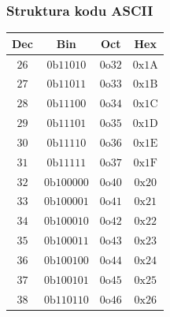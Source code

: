 \documentclass[10pt,t]{beamer}
\newcommand{\btext}{\text{b}}
\newcommand{\otext}{\text{o}}
\newcommand{\xtext}{\text{x}}
\newcommand{\Atext}{\text{A}}
\newcommand{\Btext}{\text{B}}
\newcommand{\Ctext}{\text{C}}
\newcommand{\Dtext}{\text{D}}
\newcommand{\Etext}{\text{E}}
\newcommand{\Ftext}{\text{F}}
\begin{document}
\begin{frame}
  \frametitle{Struktura kodu ASCII}


  \begin{center}

    \begin{tabular}{|c|c|c|c|}
      \hline
      Dec & Bin & Oct & Hex \\
      \hline
      $26$ & $0\btext 1 1010$\hphantom{0} & $0\otext 32$
                      & $0\xtext 1\Atext$ \\
      $27$ & $0\btext 1 1011$\hphantom{0} & $0\otext 33$
                      & $0\xtext 1\Btext$ \\
      $28$ & $0\btext 1 1100$\hphantom{0} & $0\otext 34$
                      & $0\xtext 1\Ctext$ \\
      $29$ & $0\btext 1 1101$\hphantom{0} & $0\otext 35$
                      & $0\xtext 1\Dtext$ \\
      $30$ & $0\btext 1 1110$\hphantom{0} & $0\otext 36$
                      & $0\xtext 1\Etext$ \\
      $31$ & $0\btext 1 1111$\hphantom{0} & $0\otext 37$
                      & $0\xtext 1\Ftext$ \\
      $32$ & $0\btext 10 0000$ & $0\otext 40$ & $0\xtext 20$ \\
      $33$ & $0\btext 10 0001$ & $0\otext 41$ & $0\xtext 21$ \\
      $34$ & $0\btext 10 0010$ & $0\otext 42$ & $0\xtext 22$ \\
      $35$ & $0\btext 10 0011$ & $0\otext 43$ & $0\xtext 23$ \\
      $36$ & $0\btext 10 0100$ & $0\otext 44$ & $0\xtext 24$ \\
      $37$ & $0\btext 10 0101$ & $0\otext 45$ & $0\xtext 25$ \\
      $38$ & $0\btext 11 0110$ & $0\otext 46$ & $0\xtext 26$ \\
      \hline
    \end{tabular}

  \end{center}

\end{frame}
\end{document}
